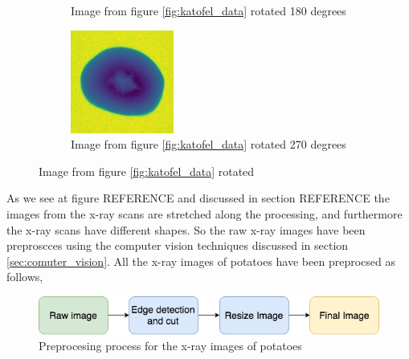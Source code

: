 \documentclass[11pt]{article}
\begin{document}
\begin{figure}[!h]
\begin{subfigure}[b]{0.3\textwidth}
        \caption{Image from figure \ref{fig:katofel_data} rotated 180 degrees}
         \label{fig:rcnn_result2}
     \end{subfigure}
     \hfill
     \begin{subfigure}[b]{0.3\textwidth}
         \centering
         \includegraphics[width=\textwidth]{figurer/hollow_15_270.jpg}
         \caption{Image from figure \ref{fig:katofel_data} rotated 270 degrees}
         \label{fig:rcnn_result3}
     \end{subfigure}
    \caption{Image from figure \ref{fig:katofel_data} rotated}
        \label{fig:rotate_90_180_270}
\end{figure}

As we see at figure REFERENCE and discussed in section REFERENCE the
images from the x-ray scans are stretched along the processing, and furthermore the x-ray scans have different shapes. So the raw x-ray images have been preproscces using the computer vision techniques discussed in section \ref{sec:comuter_vision}. All the x-ray images of potatoes have been preprocsed as follows,
\begin{figure}[!h]\label{fig:potato_preprocess}
    \centering
    \includegraphics[scale=0.2]{figurer/potato_experiment/preproces.png}
    \caption{Preprocesing process for the x-ray images of potatoes}
\end{figure}
\end{document}
